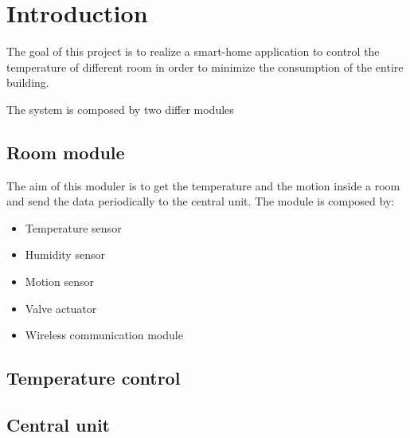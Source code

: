 \section{Introduction}
The goal of this project is to realize a smart-home application to control the temperature of different room in order to minimize the consumption of the entire building.

The system is composed by two differ modules

\subsection{Room module}
The aim of this moduler is to get the temperature and the motion inside a room and send the data periodically to the central unit.
The module is composed by:

\begin{itemize}
	\item Temperature sensor
	\item Humidity sensor
	\item Motion sensor
	\item Valve actuator
	\item Wireless communication module
\end{itemize}

\subsection{Temperature control}



\subsection{Central unit}